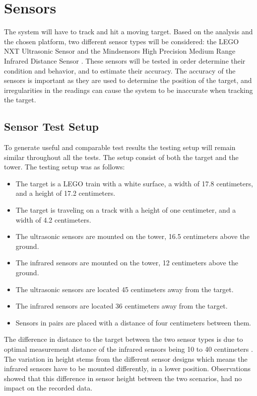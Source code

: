 \section{Sensors}\label{sec:sensors}
The system will have to track and hit a moving target. Based on the analysis and the chosen platform, two different sensor types will be considered: the LEGO NXT Ultrasonic Sensor \cite{legoultrasonic} and the Mindsensors High Precision Medium Range Infrared Distance Sensor \cite{mindinfrared}. These sensors will be tested in order determine their condition and behavior, and to estimate their accuracy. The accuracy of the sensors is important as they are used to determine the position of the target, and irregularities in the readings can cause the system to be inaccurate when tracking the target.


\subsection{Sensor Test Setup}\label{senstest}
To generate useful and comparable test results the testing setup will remain similar throughout all the tests. The setup consist of both the target and the tower. The testing setup was as follows:



\begin{itemize}
\item The target is a LEGO train with a white surface, a width of 17.8 centimeters, and a height of 17.2 centimeters.
\item The target is traveling on a track with a height of one centimeter, and a width of 4.2 centimeters.
\item The ultrasonic sensors are mounted on the tower, 16.5 centimeters above the ground.
\item The infrared sensors are mounted on the tower, 12 centimeters above the ground.
\item The ultrasonic sensors are located 45 centimeters away from the target.
\item The infrared sensors are located 36 centimeters away from the target.
\item Sensors in pairs are placed with a distance of four centimeters between them.
\end{itemize}

The difference in distance to the target between the two sensor types is due to optimal measurement distance of the infrared sensors being 10 to 40 centimeters \cite{minduserguide}. The variation in height stems from the different sensor designs which means the infrared sensors have to be mounted differently, in a lower position. Observations showed that this difference in sensor height between the two scenarios, had no impact on the recorded data. \\

